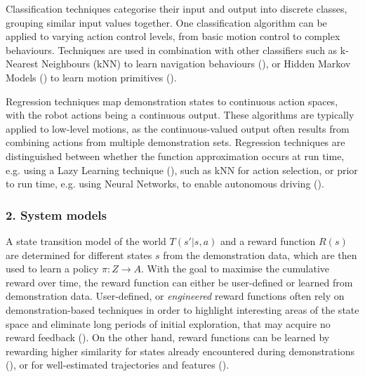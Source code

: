Classification techniques categorise their input and output into discrete classes, grouping similar input values together. One classification algorithm can be applied to varying action control levels, from basic motion control to complex behaviours. Techniques are used in combination with other classifiers such as k-Nearest Neighbours (kNN) to learn navigation behaviours (\cite{saunders2006teaching}), or Hidden Markov Models (\cite{hovland1996skill}) to learn motion primitives (\cite{rybski1999interactive}).

Regression techniques map demonstration states to continuous action spaces, with the robot actions being a continuous output. These algorithms are typically applied to low-level motions, as the continuous-valued output often results from combining actions from multiple demonstration sets. Regression techniques are distinguished between whether the function approximation occurs at run time, e.g. using a Lazy Learning technique (\cite{atkeson1997locally}), such as kNN for action selection, or prior to run time, e.g. using Neural Networks, to enable autonomous driving (\cite{pomerleau1991efficient}).

\subsubsection{2. System models}
A state transition model of the world $T(s'|s, a)$ and a reward function $R(s)$ are determined for different states $s$ from the demonstration data, which are then used to learn a policy $\pi : Z \rightarrow A$. With the goal to maximise the cumulative reward over time, the reward function can either be user-defined or learned from demonstration data.
User-defined, or \textit{engineered} reward functions often rely on demonstration-based techniques in order to highlight interesting areas of the state space and eliminate long periods of initial exploration, that may acquire no reward feedback (\cite{smart2002effective}).
On the other hand, reward functions can be learned by rewarding higher similarity for states already encountered during demonstrations (\cite{atkeson1997robot}), or for well-estimated trajectories and features (\cite{abbeel2004apprenticeship}).
